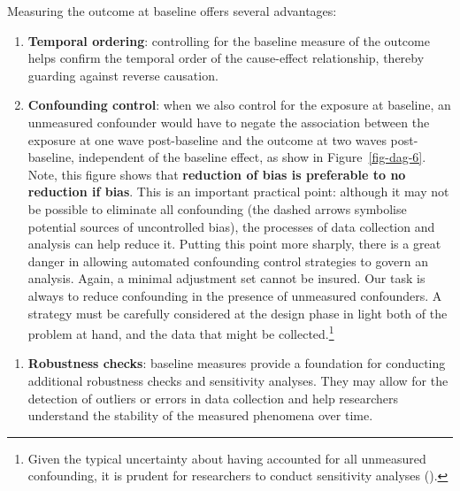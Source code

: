 \documentclass[
  singlecolumn]{article}
\providecommand{\tightlist}{%
  \setlength{\itemsep}{0pt}\setlength{\parskip}{0pt}}\usepackage{longtable,booktabs,array}
\begin{document}
Measuring the outcome at baseline offers several advantages:

\begin{enumerate}
\def\labelenumi{\alph{enumi}.}
\item
  \textbf{Temporal ordering}: controlling for the baseline measure of
  the outcome helps confirm the temporal order of the cause-effect
  relationship, thereby guarding against reverse causation.
\item
  \textbf{Confounding control}: when we also control for the exposure at
  baseline, an unmeasured confounder would have to negate the
  association between the exposure at one wave post-baseline and the
  outcome at two waves post-baseline, independent of the baseline
  effect, as show in Figure~\ref{fig-dag-6}. Note, this figure shows
  that \textbf{reduction of bias is preferable to no reduction if bias}.
  This is an important practical point: although it may not be possible
  to eliminate all confounding (the dashed arrows symbolise potential
  sources of uncontrolled bias), the processes of data collection and
  analysis can help reduce it. Putting this point more sharply, there is
  a great danger in allowing automated confounding control strategies to
  govern an analysis. Again, a minimal adjustment set cannot be insured.
  Our task is always to reduce confounding in the presence of unmeasured
  confounders. A strategy must be carefully considered at the design
  phase in light both of the problem at hand, and the data that might be
  collected.\footnote{Given the typical uncertainty about having
    accounted for all unmeasured confounding, it is prudent for
    researchers to conduct sensitivity analyses
    ().}
\end{enumerate}

\begin{enumerate}
\def\labelenumi{\alph{enumi}.}
\setcounter{enumi}{2}
\tightlist
\item
  \textbf{Robustness checks}: baseline measures provide a foundation for
  conducting additional robustness checks and sensitivity analyses. They
  may allow for the detection of outliers or errors in data collection
  and help researchers understand the stability of the measured
  phenomena over time.
\end{enumerate}
\end{document}
